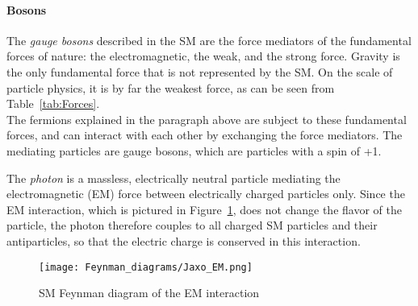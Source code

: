 \paragraph{Bosons}
The \textit{gauge bosons} described in the SM are the force mediators of the fundamental forces of nature:
the electromagnetic, the weak, and the strong force.
Gravity is the only fundamental force that is not represented by the SM.
On the scale of particle physics, it is by far the weakest force, as can be seen from Table~\ref{tab:Forces}.
\\The fermions explained in the paragraph above are subject to these fundamental forces, and can interact with each other by exchanging the force mediators.
The mediating particles are gauge bosons, which are particles with a spin of +1.\\
\begin{minipage}{0.55\textwidth}
The \textit{photon} is a massless, electrically neutral particle mediating the electromagnetic (EM) force between electrically charged particles only.
Since the EM interaction, which is pictured in Figure~\ref{fig:Feynman:EM}, does not change the flavor of the particle, the photon therefore couples to all charged SM particles and their antiparticles, so that the electric charge is conserved in this interaction.
\end{minipage} \hfill
\begin{minipage}{0.4\textwidth}
\centering
\begin{figure}[H]\centering
\texttt{[image: Feynman\_diagrams/Jaxo\_EM.png]}
\caption{SM Feynman diagram of the EM interaction}
\label{fig:Feynman:EM} 
\end{figure}
\end{minipage}

